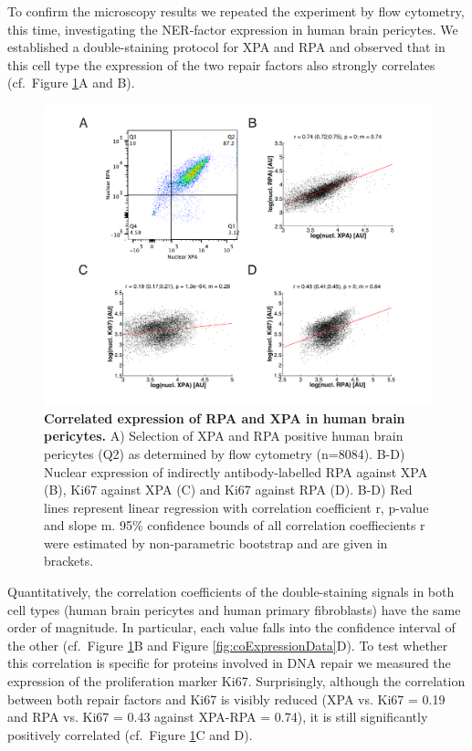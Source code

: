 To confirm the microscopy results we repeated the experiment by flow cytometry, this time, investigating the NER-factor expression in human brain pericytes. We established a double-staining protocol for XPA and RPA and observed that in this cell type the expression of the two repair factors also strongly correlates (cf.\ Figure \ref{fig:FC_correlation}A and B).    
\begin{figure}[t]
	\begin{center}
		\includegraphics[width=1\textwidth]{Abbildungen/figureTAC_3.pdf}
		\caption{\textbf{Correlated expression of RPA and XPA in human brain pericytes.} A) Selection of XPA and RPA positive human brain pericytes (Q2) as determined by flow cytometry (n=8084). B-D) Nuclear expression of indirectly antibody-labelled RPA against XPA (B), Ki67 against XPA (C) and Ki67 against RPA (D). B-D) Red lines represent linear regression with correlation coefficient r, p-value and slope m. 95\% confidence bounds of all correlation coeffiecients r were estimated by non-parametric bootstrap and are given in brackets.}
		\label{fig:FC_correlation}
	\end{center}
\end{figure}
Quantitatively, the correlation coefficients of the double-staining signals in both cell types (human brain pericytes and human primary fibroblasts) have the same order of magnitude. In particular, each value falls into the confidence interval of the other (cf.\ Figure \ref{fig:FC_correlation}B and Figure \ref{fig:coExpressionData}D). To test whether this correlation is specific for proteins involved in DNA repair we measured the expression of the proliferation marker Ki67. Surprisingly, although the correlation between both repair factors and Ki67 is visibly reduced (XPA vs. Ki67 = 0.19 and RPA vs. Ki67 = 0.43 against XPA-RPA = 0.74), it is still significantly positively correlated (cf.\ Figure \ref{fig:FC_correlation}C and D).\\
